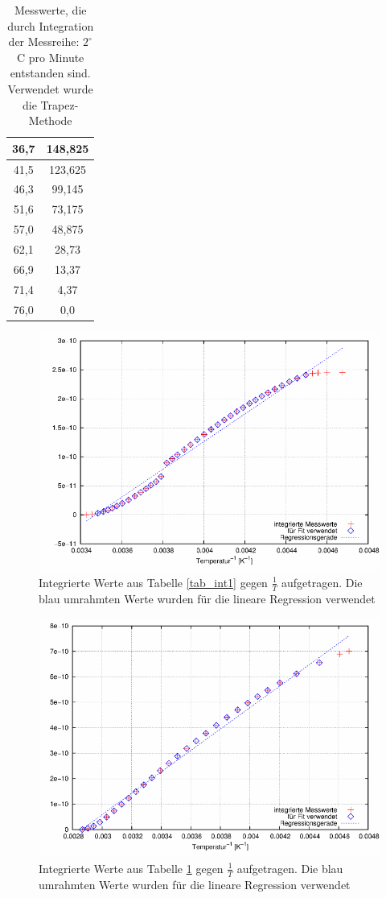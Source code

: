 \begin{table}[htbp]
\begin{minipage}[t]{0.45\textwidth}
\begin{tabular}{c|c}
36,7 &148,825\\\hline
41,5 &123,625\\\hline
46,3 &99,145\\\hline
51,6 &73,175\\\hline
57,0 &48,875\\\hline
62,1 &28,73\\\hline
66,9 &13,37\\\hline
71,4 &4,37\\\hline
76,0 &0,0\\\hline
\end{tabular}
\end{minipage}
\caption{Messwerte, die durch Integration der  Messreihe: $2^\circ$C pro Minute entstanden sind. Verwendet wurde die Trapez-Methode}
\label{tab_int2}
\end{table}
\begin{figure}[H]
\includegraphics[scale=0.8]{../gnu/relax31.pdf}
\caption{Integrierte Werte aus Tabelle \ref{tab_int1} gegen $\frac{1}{T}$ aufgetragen. Die blau umrahmten Werte wurden für die lineare Regression verwendet}
\label{pic_int1}
\end{figure}
\begin{figure}[H]
\includegraphics[scale=0.75]{../gnu/relax32.pdf}
\caption{Integrierte Werte aus Tabelle \ref{tab_int2} gegen $\frac{1}{T}$ aufgetragen. Die blau umrahmten Werte wurden für die lineare Regression verwendet}
\label{pic_int2}
\end{figure}
